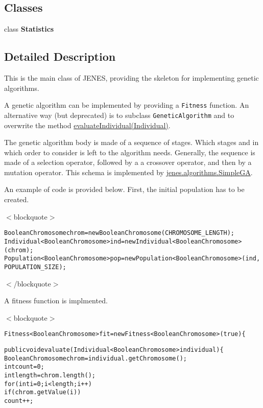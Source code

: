 \subsection*{Classes}
\begin{CompactItemize}
\item 
class \textbf{Statistics}
\end{CompactItemize}


\subsection{Detailed Description}
This is the main class of JENES, providing the skeleton for implementing genetic algorithms. 

A genetic algorithm can be implemented by providing a {\tt Fitness} function. An alternative way (but deprecated) is to subclass {\tt GeneticAlgorithm} and to overwrite the method \hyperlink{}{evaluateIndividual(Individual)}. 

The genetic algorithm body is made of a sequence of stages. Which stages and in which order to consider is left to the algorithm needs. Generally, the sequence is made of a selection operator, followed by a a crossover operator, and then by a mutation operator. This schema is implemented by \hyperlink{}{jenes.algorithms.SimpleGA}. 

An example of code is provided below. First, the initial population has to be created. 

$<$blockquote$>$

\small\begin{alltt}
 BooleanChromosome chrom = new BooleanChromosome(CHROMOSOME\_LENGTH);
 Individual<BooleanChromosome> ind = new Individual<BooleanChromosome>(chrom);
 Population<BooleanChromosome> pop = new Population<BooleanChromosome>(ind,
 		POPULATION\_SIZE);
 \end{alltt}
\normalsize 


$<$/blockquote$>$ 

A fitness function is implmented.

$<$blockquote$>$ \small\begin{alltt}
 Fitness<BooleanChromosome> fit = new Fitness<BooleanChromosome>(true) \{\end{alltt}
\normalsize 


\small\begin{alltt}     
     public void evaluate(Individual<BooleanChromosome> individual) \{
         BooleanChromosome chrom = individual.getChromosome();
         int count = 0;
         int length=chrom.length();
         for(int i=0;i<length;i++)
             if(chrom.getValue(i))
                 count++;\end{alltt}
\normalsize 


